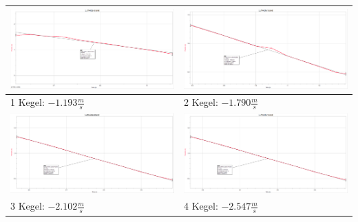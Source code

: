 \begin{tabular}{|l|l|}
	\hline
	\includegraphics[width=8cm]{graphs/scr1} &
	\includegraphics[width=8cm]{graphs/scr2}
	\\\hline 
	1 Kegel: \(-1.193 \frac{m}{s} \) &
	2 Kegel: \(-1.790 \frac{m}{s}\)
	\\\hline
	\includegraphics[width=8cm]{graphs/scr3} &
	\includegraphics[width=8cm]{graphs/scr4}
	\\\hline 
	3 Kegel: \(-2.102\frac{m}{s} \) &
	4 Kegel: \(-2.547\frac{m}{s}\)
	\\\hline
	
\end{tabular}